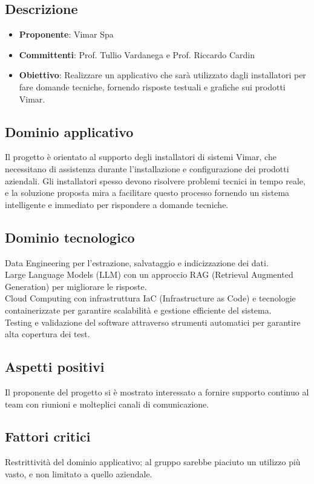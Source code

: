 \documentclass[italian, 12pt]{article}
\begin{document}
\subsection{Descrizione}
\begin{itemize}
\item\textbf{Proponente}: Vimar Spa
\item\textbf{Committenti}: Prof. Tullio Vardanega e Prof. Riccardo Cardin
\item\textbf{Obiettivo}: Realizzare un applicativo che sarà utilizzato dagli installatori per fare domande tecniche, fornendo risposte testuali e grafiche sui prodotti Vimar.
\end{itemize}

\subsection{Dominio applicativo}
Il progetto è orientato al supporto degli installatori di sistemi Vimar, che necessitano di assistenza durante l’installazione e configurazione dei prodotti aziendali. Gli installatori spesso devono risolvere problemi tecnici in tempo reale, e la soluzione proposta mira a facilitare questo processo fornendo un sistema intelligente e immediato per rispondere a domande tecniche.

\subsection{Dominio tecnologico}
Data Engineering per l'estrazione, salvataggio e indicizzazione dei dati.\\
Large Language Models (LLM) con un approccio RAG (Retrieval Augmented Generation) per migliorare le risposte.\\
Cloud Computing con infrastruttura IaC (Infrastructure as Code) e tecnologie containerizzate per garantire scalabilità e gestione efficiente del sistema.\\
Testing e validazione del software attraverso strumenti automatici per garantire alta copertura dei test.

\subsection{Aspetti positivi}
Il proponente del progetto si è mostrato interessato a fornire supporto continuo al team con riunioni e molteplici canali di comunicazione.

\subsection{Fattori critici}
Restrittività del dominio applicativo; al gruppo sarebbe piaciuto un utilizzo più vasto, e non limitato a quello aziendale.
\end{document}
